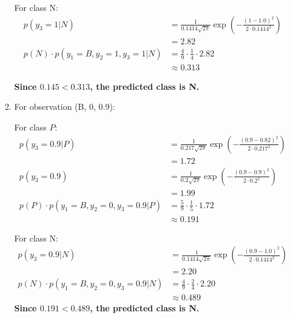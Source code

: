 \documentclass{article}
\begin{document}
\begin{enumerate}[leftmargin=\labelsep]
\begin{enumerate}
  
  For class N:
  \begin{align*}
  p(y_3=1 | N) &= \frac{1}{0.1414 \sqrt{2\pi}} \exp\left(-\frac{(1 - 1.0)^2}{2 \cdot 0.1414^2}\right) \\[10pt]
  &= 2.82\\
  p(N) \cdot p(y_1 = B, y_2 = 1, y_3=1 | N) &= \frac{4}{9} \cdot \frac{1}{4} \cdot 2.82 \\[10pt]
  &\approx 0.313
  \end{align*}
  
  \textbf{
  Since $0.145 < 0.313$, the predicted class is N.
  }

  \item For observation (B, 0, 0.9):
  
  For class \( P \):
  \begin{align*}
  p(y_3=0.9 | P) &= \frac{1}{0.217 \sqrt{2\pi}} \exp\left(-\frac{(0.9 - 0.82)^2}{2 \cdot 0.217^2}\right) \\[10pt]
  &= 1.72\\
  p(y_3=0.9) &= \frac{1}{0.2 \sqrt{2\pi}} \exp\left(-\frac{(0.9 - 0.9)^2}{2 \cdot 0.2^2}\right) \\[10pt]
  &= 1.99\\
  p(P) \cdot p(y_1 = B, y_2 = 0, y_3=0.9 | P) &= \frac{5}{9} \cdot \frac{1}{5} \cdot 1.72 \\[10pt]
  &\approx 0.191
  \end{align*}

  
  For class N:
  \begin{align*}
  p(y_3=0.9 | N) &= \frac{1}{0.1414 \sqrt{2\pi}} \exp\left(-\frac{(0.9 - 1.0)^2}{2 \cdot 0.1414^2}\right) \\[10pt]
  &= 2.20\\
  p(N) \cdot p(y_1 = B, y_2 = 0, y_3=0.9 | N) &= \frac{4}{9} \cdot \frac{2}{4} \cdot 2.20 \\[10pt]
  &\approx 0.489
  \end{align*}
  \textbf{
  Since $0.191 < 0.489$, the predicted class is N.
  }
\end{enumerate}


\centering
{}


\end{enumerate}
\end{document}

